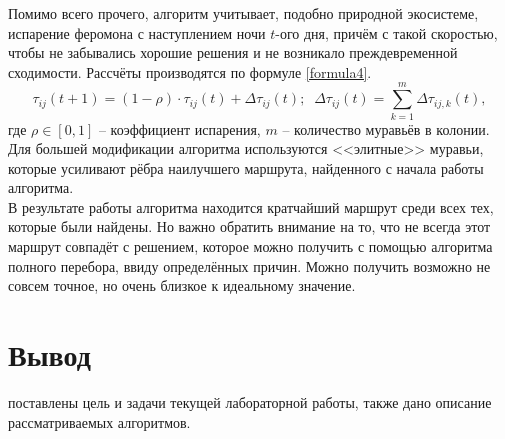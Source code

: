 Помимо всего прочего, алгоритм учитывает, подобно природной экосистеме, испарение феромона с наступлением ночи $t$-ого дня, причём с такой скоростью, чтобы не забывались хорошие решения и не возникало преждевременной сходимости. Рассчёты производятся по формуле \ref{formula4}.
\begin{equation}\label{formula4}
	\tau_{ij}(t + 1) = (1 - \rho)\cdot\tau_{ij}(t) + \Delta \tau_{ij}(t); \; \; \Delta \tau_{ij}(t) = \sum\limits_{k = 1}^m \Delta \tau_{ij, k}(t),
\end{equation}
где $\rho \in [0, 1]$ -- коэффициент испарения, $m$ -- количество муравьёв в колонии.\\

Для большей модификации алгоритма используются <<элитные>> муравьи, которые усиливают рёбра наилучшего маршрута, найденного с начала работы алгоритма. \cite{Ulyanov}\\

В результате работы алгоритма находится кратчайший маршрут среди всех тех, которые были найдены. Но важно обратить внимание на то, что не всегда этот маршрут совпадёт с решением, которое можно получить с помощью алгоритма полного перебора, ввиду определённых причин. Можно получить возможно не совсем точное, но очень близкое к идеальному значение.\\

\section*{Вывод}
 поставлены цель и задачи текущей лабораторной работы, также дано описание рассматриваемых алгоритмов.








